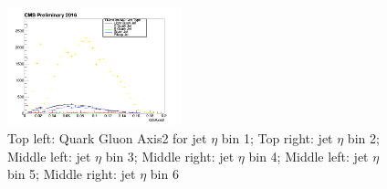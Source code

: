 \begin{figure}[htbp]
\begin{center}
  \includegraphics[width=0.45\textwidth]{sections/mc4/TopTagger/figures/_b_qgaxis2jetetabin5_.png}
 \end{center}
 \caption{Top left: Quark Gluon Axis2 for jet $\eta$ bin 1; Top right: jet $\eta$ bin 2; Middle left: jet $\eta$ bin 3; Middle right: jet $\eta$ bin 4; Middle left: jet $\eta$ bin 5; Middle right: jet $\eta$ bin 6}
 \label{fig:c4ttqgaxis2jeteta}
\end{figure}

